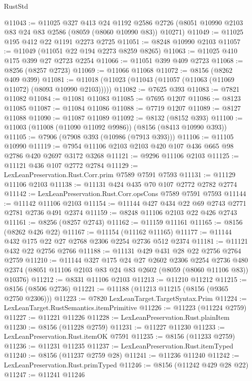 \begin{lexlean}{RustStd}
\begin{coremodule}
@11043 := @11025
    @327
    @413
    @24
    @1192
    @2586
    @2726
    (@8051 @10990 @2103 @83 @24 @83 @2586 (@8059 (@8060 @10990 @83)) @10271)
@11049 := @11025 @195 @412 @22 @1191 @2273 @2725
@11051 := @8248 @10990 @2103
@11057 := @11049 (@11051 @22 @194 @2273 @8259 @8265)
@11063 := @11025 @410 @175 @399 @27 @2723 @2254
@11066 := @11051 @399 @409 @2723
@11068 := @8256 (@8257 @2723)
@11069 := @11066 @11068
@11072 := @8156 (@8262 @409 @399)
@11081 := @11018 (@11023 (@11043 (@11057 (@11063 (@11069 @11072) (@8093 @10990 @2103)))))
@11082 := @7625 @393
@11083 := @7821 @11082
@11084 := @11081 @11083
@11085 := @7695 @1207
@11086 := @8123 @11085
@11087 := @11084 @11086
@11088 := @7719 @1207
@11089 := @8127 @11088
@11090 := @11087 @11089
@11092 := @8132 (@8152 @393)
@11100 := @11003 (@11008 (@11090 @11092 @9986)) (@8156 (@8413 @10990 @393))
@11105 := @7906 (@7908 @393 (@10986 (@7913 @393)))
@11106 := @11105 @10990
@11119 := @7954 @11106 @2103 @2103 @420 @107 @436 @665 @98 @2786 @420 @2697 @3172 @3268
@11121 := @9296 @11106 @2103
@11125 := @11121 @436 @107 @2772 @2784
@11129 := LexLeanPreservation.Rust.Corr.prim @7589 @7591 @7593
@11131 := @11129 @11106 @2103
@11138 := @11131 @424 @435 @70 @107 @2772 @2782 @2774
@11142 := LexLeanPreservation.Rust.Corr.opsCons @7589 @7591 @7593
@11144 := @11142 @11106 @2103
@11154 := @11144 @427 @434 @22 @69 @2743 @2771 @2781 @2736 @491 @2374
@11159 := @8248 @11106 @2103 @22 @426 @2743
@11161 := @8256 (@8257 @2743)
@11162 := @11159 @11161
@11165 := @8156 (@8262 @426 @22)
@11167 := @11154 (@11162 @11165)
@11177 := @11144 @432 @175 @22 @27 @2768 @2306 @2254 @2736 @512 @2374
@11181 := @11121 @432 @22 @2756 @2766
@11188 := @11131 @429 @431 @28 @22 @2756 @2764 @2759
@11210 := @11144
    @327
    @175
    @24
    @27
    @2602
    @2306
    @2254
    @2736
    @480
    @2374
    (@8051 @11106 @2103 @83 @24 @83 @2602 (@8059 (@8060 @11106 @83)) @10376)
@11212 := @8331 @11106 @2103
@11213 := @11210 @11212
@11215 := @8156 (@8506 @2736)
@11221 := @11188 (@11213 @11215 (@8156 (@9365 @2750 @2306)))
@11223 := @7820 LexLeanTarget.TargetSyntax.Prim
@11224 := LexLeanTarget.RustSemantics.itemPrimitive
@11226 := @11223 (@11224 @2759)
@11227 := @11221 @11226
@11228 := LexLeanPreservation.Rust.plainItem
@11230 := @8156 (@11228 @2759)
@11231 := @11227 @11230
@11233 := LexLeanPreservation.Rust.itemOK @7591
@11235 := @8156 (@11233 @2759)
@11236 := @11231 @11235
@11237 := LexLeanPreservation.Rust.itemTyped
@11240 := @8156 (@11237 @2759 @28)
@11241 := @11236 @11240
@11242 := LexLeanPreservation.Rust.primTyped
@11246 := @8156 (@11242 @429 @28 @22)
@11247 := @11241 @11246

\end{coremodule}
\end{lexlean}
